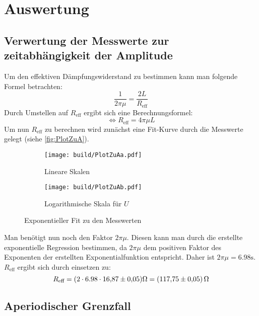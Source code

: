 \section{Auswertung}
\label{sec:Auswertung}
\subsection{Verwertung der Messwerte zur zeitabhängigkeit der Amplitude}
\label{subsec:AuswertungA}

Um den effektiven Dämpfungswiderstand zu bestimmen kann man folgende Formel betrachten: 
\begin{equation}
  \label{eqn:Abklingdauer}
  \frac{1}{2\pi\mu} = \frac{2L}{R_{\text{eff}}}
\end{equation}
Durch Umstellen auf $R_{\text{eff}}$ ergibt sich eine Berechnungsformel:
\begin{equation}
  \label{Abklingdauer1}
  \Longleftrightarrow R_{\text{eff}} = 4\pi\mu L
\end{equation}
Um nun $R_{\text{eff}}$ zu berechnen wird zunächst eine Fit-Kurve durch die Messwerte gelegt (siehe \autoref{fig:PlotZuA}).

\begin{figure}%
  \begin{subfigure}{0.48\textwidth}%
  \centering%
  \texttt{[image: build/PlotZuAa.pdf]}%
  \caption{Lineare Skalen}%
  \label{fig:PlotZuAa}%
  \end{subfigure}%
  \hfill%
  \begin{subfigure}{0.48\textwidth}%
  \centering%
  \texttt{[image: build/PlotZuAb.pdf]}%
  \caption{Logarithmische Skala für $U$}%
  \label{fig:PlotZuAb}%
  \end{subfigure}%
  \caption{Exponentieller Fit zu den Messwerten}%
  \label{fig:PlotZuA}%
  \end{figure}%

Man benötigt nun noch den Faktor $2\pi\mu$. Diesen kann man durch die erstellte exponentielle Regression 
bestimmen, da $2\pi\mu$ dem positiven Faktor des Exponenten der erstellten Exponentialfunktion entspricht. 
Daher ist $2\pi\mu = 6.98\unit{\second}$.
$R_{\text{eff}}$ ergibt sich durch einsetzen zu:
\begin{equation*}
  R_{\text{eff}} = (2\cdot 6.98\cdot \num{16.87\pm 0.05}) \unit{\ohm} = (\num{117.75 \pm 0.05})\,\unit{\ohm}
\end{equation*}

\subsection{Aperiodischer Grenzfall}
\label{subsec:AuswertungB}

